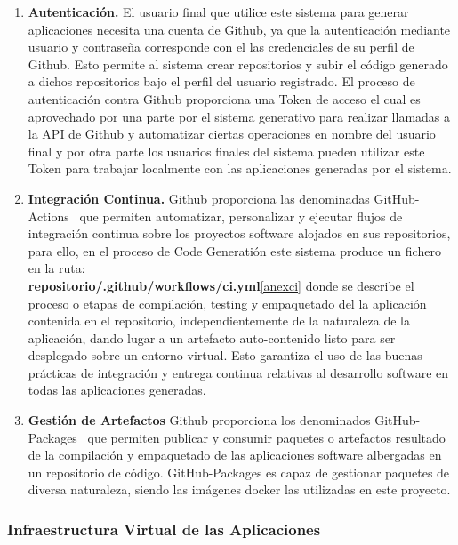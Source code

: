\documentclass[a4paper,11pt]{book}
\begin{document}
\begin{enumerate}
\item \textbf{ Autenticación.} El usuario final que utilice este sistema para generar aplicaciones necesita una cuenta de Github, ya que la autenticación mediante usuario y contraseña corresponde con el las credenciales  de su perfil de Github. Esto permite al sistema crear repositorios y subir el código generado a dichos repositorios bajo el perfil del usuario registrado. El proceso de autenticación contra Github proporciona una Token  de acceso el cual es aprovechado por una parte por el sistema generativo para realizar llamadas a la API  de Github y automatizar ciertas operaciones en nombre del usuario final y por otra parte los usuarios finales del sistema  pueden utilizar este Token para trabajar localmente con las aplicaciones generadas por el sistema.

\item   \textbf{Integración Continua.} Github proporciona las denominadas GitHub-Actions~\cite{github3}  que permiten automatizar, personalizar y ejecutar flujos de integración continua  sobre los proyectos software alojados en sus repositorios, para ello, en el proceso de Code Generatión este sistema produce un fichero  en la ruta:\\
\textbf{repositorio/.github/workflows/ci.yml}\ref{anexci} donde se describe el proceso o etapas de compilación, testing y empaquetado del la aplicación contenida en el repositorio, independientemente de la naturaleza de la aplicación, dando lugar a un artefacto auto-contenido listo para ser desplegado sobre un entorno virtual. Esto garantiza el uso de las buenas prácticas  de integración y entrega continua relativas al desarrollo software en todas las aplicaciones generadas.

\item \textbf{Gestión de Artefactos} Github proporciona los denominados GitHub-Packages~\cite{github4} que permiten publicar y consumir paquetes o artefactos resultado de la compilación y empaquetado de las aplicaciones software albergadas en un repositorio de código. GitHub-Packages es capaz de gestionar paquetes de diversa naturaleza, siendo las imágenes docker las utilizadas en este proyecto.
\end{enumerate}

\subsubsection{Infraestructura Virtual de las Aplicaciones}\label{infra}
\end{document}
